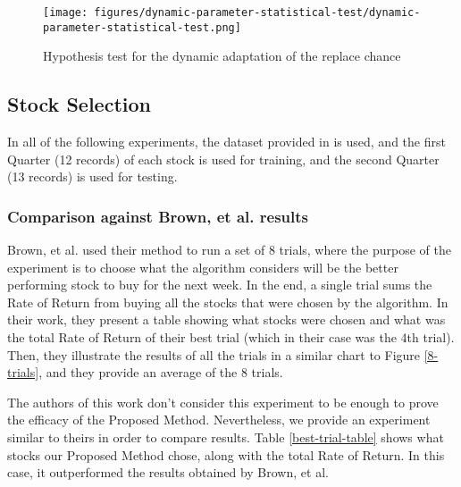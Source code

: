 \documentclass[12pt,journal,draftcls,onecolumn]{IEEEtran}
\begin{document}
\begin{figure}[htp]
\caption{Hypothesis test for the dynamic adaptation of the replace
  chance}
\label{dynamic-hypothesis-test}
\begin{center}
\texttt{[image: figures/dynamic-parameter-statistical-test/dynamic-parameter-statistical-test.png]}
\end{center}
\end{figure}

\subsection{Stock Selection}

In all of the following experiments, the dataset provided in \cite{brown2013dynamic} is used, and the first Quarter (12 records) of each stock is used for training, and the second Quarter (13 records) is used for testing.

\subsubsection{Comparison against Brown, et al. results}

Brown, et al. \cite{brown2013dynamic} used their method to run a set of 8 trials, where the purpose of the experiment is to choose what the algorithm considers will be the better performing stock to buy for the next week. In the end, a single trial sums the Rate of Return from buying all the stocks that were chosen by the algorithm. In their work, they present a table showing what stocks were chosen and what was the total Rate of Return of their best trial (which in their case was the 4th trial). Then, they illustrate the results of all the trials in a similar chart to Figure \ref{8-trials}, and they provide an average of the 8 trials.

The authors of this work don't consider this experiment to be enough to prove the efficacy of the Proposed Method. Nevertheless, we provide an experiment similar to theirs in order to compare results. Table \ref{best-trial-table} shows what stocks our Proposed Method chose, along with the total Rate of Return. In this case, it outperformed the results obtained by Brown, et al.
    
\end{document}
